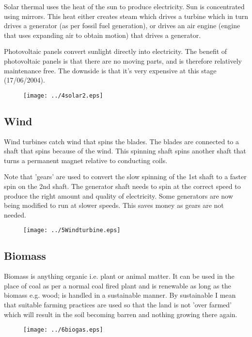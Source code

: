 Solar thermal uses the heat of the sun to produce electricity. Sun
is concentrated using mirrors. This heat either creates steam which
drives a turbine which in turn drives a generator (as per fossil
fuel generation), or drives an air engine (engine that uses
expanding air to obtain motion) that drives a generator.

Photovoltaic panels convert sunlight directly into electricity. The
benefit of photovoltaic panels is that there are no moving parts,
and is therefore relatively maintenance free. The downside is that
it's very expensive at this stage (17/06/2004).

\begin{figure}[H]
\centering
\texttt{[image: ../4solar2.eps]}
\end{figure}

\subsection*{Wind}

Wind turbines catch wind that spins the blades. The blades are
connected to a shaft that spins because of the wind. This spinning
shaft spins another shaft that turns a permanent magnet relative to
conducting coils.

Note that 'gears' are used to convert the slow spinning of the 1st
shaft to a faster spin on the 2nd shaft. The generator shaft needs
to spin at the correct speed to produce the right amount and quality
of electricity. Some generators are now being modified to run at
slower speeds. This saves money as gears are not needed.

\begin{figure}[H]
\centering
\texttt{[image: ../5Windturbine.eps]}
\end{figure}

\subsection*{Biomass}

Biomass is anything organic i.e. plant or animal matter. It can be
used in the place of coal as per a normal coal fired plant and is
renewable as long as the biomass e.g. wood; is handled in a
sustainable manner. By sustainable I mean that suitable farming
practices are used so that the land is not 'over farmed' which will
result in the soil becoming barren and nothing growing there again.

\begin{figure}[H]
\centering
\texttt{[image: ../6biogas.eps]}
\end{figure}

